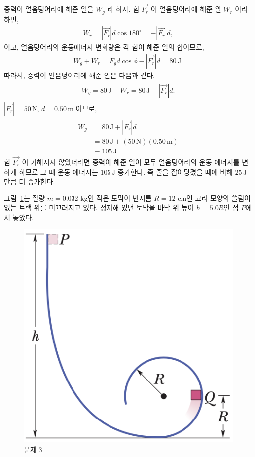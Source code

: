 \documentclass[floatfix,nofootinbib,superscriptaddress,fleqn]{revtex4-2}
\begin{document}
중력이 얼음덩어리에 해준 일을 $W_g$ 라 하자. 
힘 $\vec{F_r}$ 이 얼음덩어리에 해준 일 $W_r$ 이라 하면,
\begin{align}
  W_r = |\vec{F_r}| d \cos{180^\circ} = -|\vec{F_r}| d,
\end{align}
이고, 얼음덩어리의 운동에너지 변화량은 각 힘이 해준 일의 합이므로,
\begin{align}
  W_g+W_r = F_g d \cos{\phi} -|\vec{F_r}| d = 80\,\mathrm{J}.
\end{align}
따라서, 중력이 얼음덩어리에 해준 일은 다음과 같다.
\begin{align}
  \begin{split}
    W_g=80\,\mathrm{J}-W_r=80\,\mathrm{J}+|\vec{F_r}| d .
  \end{split}
\end{align}
$|\vec{F_r}|=50\,\mathrm{N}$, $d=0.50\,\mathrm{m}$ 이므로,
\begin{align}
  \begin{split}
    W_g&=80\,\mathrm{J}+|\vec{F_r}| d  \\
    &=80\,\mathrm{J}+(50\,\mathrm{N})(0.50\,\mathrm{m}) \\
    &=105\,\mathrm{J}
  \end{split}
\end{align}
힘 $\vec{F_r}$ 이 가해지지 않았더라면 중력이 해준 일이 모두 얼음덩어리의 운동 에너지를
변하게 하므로 그 때 운동 에너지는 $105\,\mathrm{J}$ 증가한다. 즉 줄을 잡아당겼을 때에 
비해 $25\,\mathrm{J}$ 만큼 더 증가한다.

\vspace{1cm}

그림~\ref{fig:3}는 질량 $m=0.032$ kg인 작은 토막이 반지름 $R=12$ cm인
고리 모양의 쓸림이 없는 트랙 위를 미끄러지고 있다. 정지해 있던 토막을
바닥 위 높이 $h=5.0 R$인 점 $P$에서 놓았다. 
\begin{figure}[ht]
  \centering
\includegraphics[scale=0.3]{Qfig8-3-20220328.png}
  \caption{문제 3}
  \label{fig:3}
\end{figure}
\end{document}
